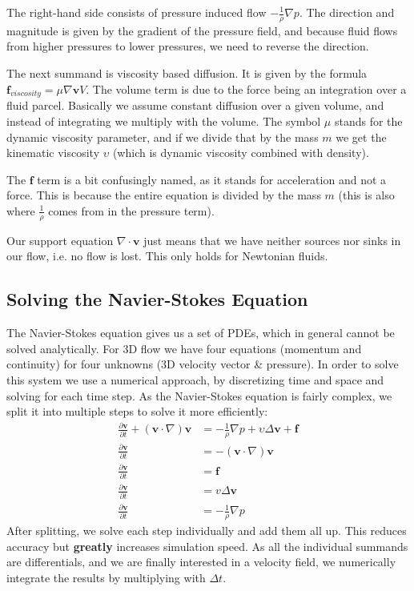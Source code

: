 \documentclass{article}
\begin{document}
The right-hand side consists of pressure induced flow $-\frac{1}{\rho}\nabla p$.
The direction and magnitude is given by the gradient of the pressure field, and because fluid flows from higher pressures to lower pressures, we need to reverse the direction.

The next summand is viscosity based diffusion.
It is given by the formula $\bm{f}_{viscosity} = \mu \nabla \bm{v}V$.
The volume term is due to the force being an integration over a fluid parcel.
Basically we assume constant diffusion over a given volume, and instead of integrating we multiply with the volume.
The symbol $\mu$ stands for the dynamic viscosity parameter, and if we divide that by the mass $m$ we get the kinematic viscosity $\upsilon$ (which is dynamic viscosity combined with density).

The $\bm{f}$ term is a bit confusingly named, as it stands for acceleration and not a force.
This is because the entire equation is divided by the mass $m$ (this is also where $\frac{1}{\rho}$ comes from in the pressure term).

Our support equation $\nabla \cdot \bm{v}$ just means that we have neither sources nor sinks in our flow, i.e. no flow is lost.
This only holds for Newtonian fluids.

\subsection{Solving the Navier-Stokes Equation}
The Navier-Stokes equation gives us a set of PDEs, which in general cannot be solved analytically.
For 3D flow we have four equations (momentum and continuity) for four unknowns (3D velocity vector \& pressure).
In order to solve this system we use a numerical approach, by discretizing time and space and solving for each time step.
As the Navier-Stokes equation is fairly complex, we split it into multiple steps to solve it more efficiently:
\begin{align}
    \frac{\partial \bm{v}}{\partial t} + (\bm{v} \cdot \nabla)\bm{v} &= -\frac{1}{\rho} \nabla p + \upsilon \Delta \bm{v} + \bm{f}\\
    \frac{\partial \bm{v}}{\partial t} &= -(\bm{v} \cdot \nabla) \bm{v}\\
    \frac{\partial \bm{v}}{\partial t} &= \bm{f}\\
    \frac{\partial \bm{v}}{\partial t} &= v \Delta \bm{v}\\
    \frac{\partial \bm{v}}{\partial t} &= - \frac{1}{\rho} \nabla p
\end{align}
After splitting, we solve each step individually and add them all up.
This reduces accuracy but \textbf{greatly} increases simulation speed.
As all the individual summands are differentials, and we are finally interested in a velocity field, we numerically integrate the results by multiplying with $\Delta t$.
\end{document}
